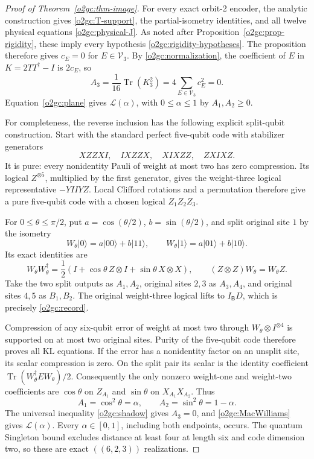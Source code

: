 \documentclass[11pt]{article}
\newcommand{\ket}[1]{\lvert #1\rangle}
\theoremstyle{definition}
\begin{document}
\begin{proof}[Proof of Theorem~\ref{o2gc:thm-image}]
For every exact orbit-2 encoder, the analytic construction gives
\eqref{o2gc:T-support}, the partial-isometry identities, and all twelve
physical equations \eqref{o2gc:physical-J}. As noted after
Proposition~\ref{o2gc:prop-rigidity}, these imply every hypothesis
\eqref{o2gc:rigidity-hypotheses}. The proposition therefore gives
\(c_E=0\) for \(E\in\mathcal V_3\). By
\eqref{o2gc:normalization}, the coefficient of \(E\) in
\(K=2TT^\dagger-I\) is \(2c_E\), so
\begin{equation}
 A_3=\frac1{16}\operatorname{Tr}(K_3^2)
     =4\sum_{E\in\mathcal V_3}c_E^2=0.
 \label{o2gc:A3-zero}
\end{equation}
Equation~\eqref{o2gc:plane} gives \(\mathcal L(\alpha)\), with
\(0\le\alpha\le1\) by \(A_1,A_2\ge0\).

For completeness, the reverse inclusion has the following explicit
split-qubit construction. Start with the standard perfect five-qubit
code with stabilizer generators
\[
 XZZXI,\quad IXZZX,\quad XIXZZ,\quad ZXIXZ.
\]
It is pure: every nonidentity Pauli of weight at most two has zero
compression. Its logical \(Z^{\otimes5}\), multiplied by the first
generator, gives the weight-three logical representative \(-YIIYZ\).
Local Clifford rotations and a permutation therefore give a pure
five-qubit code with a chosen logical \(Z_1Z_2Z_3\).

For \(0\le\theta\le\pi/2\), put \(a=\cos(\theta/2)\),
\(b=\sin(\theta/2)\), and split original site \(1\) by the isometry
\[
 W_\theta\ket0=a\ket{00}+b\ket{11},\qquad
 W_\theta\ket1=a\ket{01}+b\ket{10}.
\]
Its exact identities are
\begin{equation}
 W_\theta W_\theta^\dagger
 =\frac12(I+\cos\theta\,Z\otimes I+\sin\theta\,X\otimes X),
 \qquad (Z\otimes Z)W_\theta=W_\theta Z.
 \label{o2gc:split-construction}
\end{equation}
Take the two split outputs as \(A_1,A_2\), original sites \(2,3\)
as \(A_3,A_4\), and original sites \(4,5\) as \(B_1,B_2\).
The original weight-three logical lifts to \(I_{\mathsf B}D\),
which is precisely \eqref{o2gc:record}.

Compression of any six-qubit error of weight at most two through
\(W_\theta\otimes I^{\otimes4}\) is supported on at most two original
sites. Purity of the five-qubit code therefore proves all KL equations.
If the error has a nonidentity factor on an unsplit site, its scalar
compression is zero. On the split pair its scalar is the identity
coefficient \(\operatorname{Tr}(W_\theta^\dagger E W_\theta)/2\).
Consequently the only nonzero weight-one and weight-two coefficients
are \(\cos\theta\) on \(Z_{A_1}\) and \(\sin\theta\) on
\(X_{A_1}X_{A_2}\). Thus
\[
 A_1=\cos^2\theta=\alpha,\qquad A_2=\sin^2\theta=1-\alpha.
\]
The universal inequality \eqref{o2gc:shadow} gives \(A_3=0\), and
\eqref{o2gc:MacWilliams} gives \(\mathcal L(\alpha)\). Every
\(\alpha\in[0,1]\), including both endpoints, occurs. The quantum
Singleton bound excludes distance at least four at length six and
code dimension two, so these are exact \(((6,2,3))\) realizations.
\end{proof}
\end{document}
